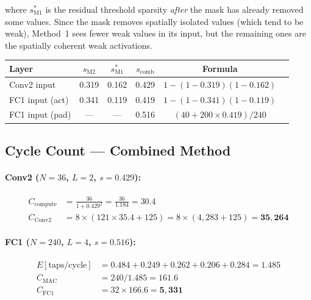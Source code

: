 \documentclass[11pt,a4paper]{article}
\begin{document}
where $s_{\text{M1}}^*$ is the residual threshold sparsity \emph{after} the
mask has already removed some values. Since the mask removes spatially isolated
values (which tend to be weak), Method~1 sees fewer weak values in its input,
but the remaining ones are the spatially coherent weak activations.

\begin{center}
\begin{tabular}{lccccc}
\toprule
\textbf{Layer} & $s_{\text{M2}}$ & $s_{\text{M1}}^*$ & $s_{\text{comb}}$ & \textbf{Formula} \\
\midrule
Conv2 input     & 0.319 & 0.162 & 0.429 & $1-(1-0.319)(1-0.162)$ \\
FC1 input (act) & 0.341 & 0.119 & 0.419 & $1-(1-0.341)(1-0.119)$ \\
FC1 input (pad) & —     & —     & 0.516 & $(40+200\times0.419)/240$ \\
\bottomrule
\end{tabular}
\end{center}

\subsection{Cycle Count — Combined Method}

\paragraph{Conv2 ($N=36$, $L=2$, $s=0.429$):}
\begin{align}
C_{\text{compute}} &= \frac{36}{1 + 0.429^2} = \frac{36}{1.184} = 30.4 \\
C_{\text{Conv2}} &= 8 \times (121 \times 35.4 + 125) = 8 \times (4{,}283 + 125) = \mathbf{35{,}264}
\end{align}

\paragraph{FC1 ($N=240$, $L=4$, $s=0.516$):}
\begin{align}
E[\text{taps/cycle}] &= 0.484 + 0.249 + 0.262 + 0.206 + 0.284 = 1.485 \\
C_{\text{MAC}} &= 240 / 1.485 = 161.6 \\
C_{\text{FC1}} &= 32 \times 166.6 = \mathbf{5{,}331}
\end{align}
\end{document}
